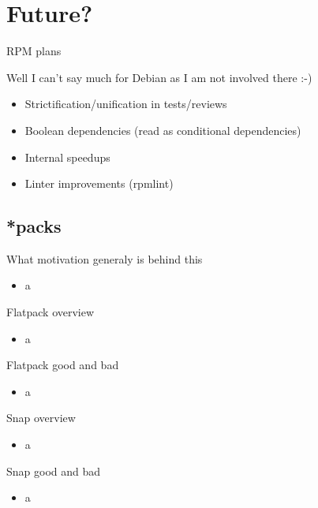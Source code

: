 \documentclass{beamer}
\begin{document}
\section{Future?}

\begin{frame}[t]{RPM plans}
    \begin{center}Well I can't say much for Debian as I am not involved there :-)\end{center}
	\begin{itemize}
	\item Strictification/unification in tests/reviews
	\item Boolean dependencies (read as conditional dependencies)
	\item Internal speedups
	\item Linter improvements (rpmlint)
	\end{itemize}
\end{frame}

\subsection{*packs}

\begin{frame}[t]{What motivation generaly is behind this}
	\begin{itemize}
	\item a
	\end{itemize}
\end{frame}

\begin{frame}[t]{Flatpack overview}
	\begin{itemize}
	\item a
	\end{itemize}
\end{frame}

\begin{frame}[t]{Flatpack good and bad}
	\begin{itemize}
	\item a
	\end{itemize}
\end{frame}

\begin{frame}[t]{Snap overview}
	\begin{itemize}
	\item a
	\end{itemize}
\end{frame}

\begin{frame}[t]{Snap good and bad}
	\begin{itemize}
	\item a
	\end{itemize}
\end{frame}
\end{document}
